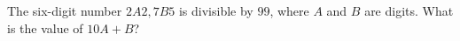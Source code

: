 The six-digit number $2A2{,}7B5$ is divisible by $99$, where $A$ and $B$ are digits. What is the value of $10A+B$?
